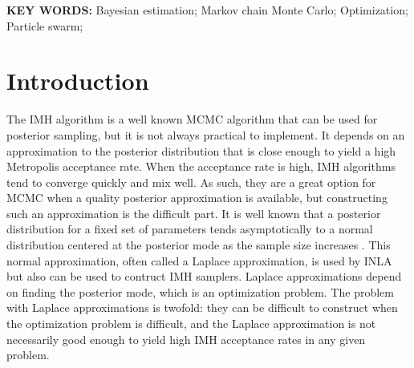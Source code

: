 \documentclass[12pt]{article}
\begin{document}
\baselineskip=12pt
\par\vfill\noindent
{\bf KEY WORDS:} 
Bayesian estimation; Markov chain Monte Carlo; Optimization; Particle swarm;
\par\medskip\noindent


\clearpage\pagebreak\newpage {}
\baselineskip=24pt

\section{Introduction}

The IMH algorithm \citep{metropolis1953equation,hastings1970monte,robert2013monte} is a well known MCMC algorithm that can be used for posterior sampling, but it is not always practical to implement. It depends on an approximation to the posterior distribution that is close enough to yield a high Metropolis acceptance rate. When the acceptance rate is high, IMH algorithms tend to converge quickly and mix well. As such, they are a great option for MCMC when a quality posterior approximation is available, but constructing such an approximation is the difficult part. It is well known that a posterior distribution for a fixed set of parameters tends asymptotically to a normal distribution centered at the posterior mode as the sample size increases \citep[Chapter~7.4]{schervish1997theory}. This normal approximation, often called a Laplace approximation, is used by INLA \citep{rue2009approximate} but also can be used to contruct IMH samplers. Laplace approximations depend on finding the posterior mode, which is an optimization problem. The problem with Laplace approximations is twofold: they can be difficult to construct when the optimization problem is difficult, and the Laplace approximation is not necessarily good enough to yield high IMH acceptance rates in any given problem.
\end{document}
